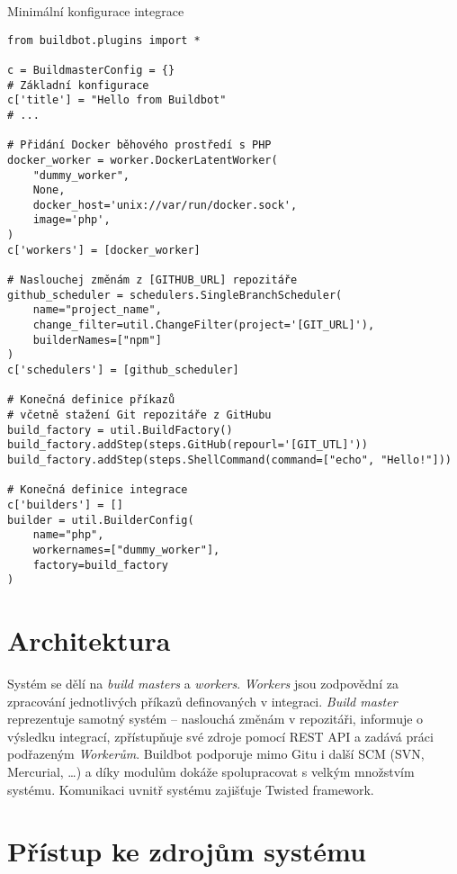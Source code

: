 \begin{listing}[ht]
\caption{\label{code:buildbot-minimal-config}Minimální konfigurace integrace}
\begin{verbatim}
from buildbot.plugins import *

c = BuildmasterConfig = {}
# Základní konfigurace
c['title'] = "Hello from Buildbot"
# ...

# Přidání Docker běhového prostředí s PHP
docker_worker = worker.DockerLatentWorker(
    "dummy_worker",
    None,
    docker_host='unix://var/run/docker.sock',
    image='php',
)
c['workers'] = [docker_worker]

# Naslouchej změnám z [GITHUB_URL] repozitáře
github_scheduler = schedulers.SingleBranchScheduler(
    name="project_name",
    change_filter=util.ChangeFilter(project='[GIT_URL]'),
    builderNames=["npm"]
)
c['schedulers'] = [github_scheduler]

# Konečná definice příkazů
# včetně stažení Git repozitáře z GitHubu
build_factory = util.BuildFactory()
build_factory.addStep(steps.GitHub(repourl='[GIT_UTL]'))
build_factory.addStep(steps.ShellCommand(command=["echo", "Hello!"]))

# Konečná definice integrace
c['builders'] = []
builder = util.BuilderConfig(
    name="php",
    workernames=["dummy_worker"],
    factory=build_factory
)

\end{verbatim}
\end{listing}

\section{Architektura}

Systém se dělí na \textit{build masters} a \textit{workers}.
\textit{Workers} jsou zodpovědní za zpracování jednotlivých příkazů definovaných v integraci.
\textit{Build master} reprezentuje samotný systém -- naslouchá změnám v repozitáři, informuje o výsledku integrací, zpřístupňuje své zdroje pomocí REST API a zadává práci podřazeným \textit{Workerům}.
Buildbot podporuje mimo Gitu i další SCM (SVN, Mercurial, \ldots) a díky modulům dokáže spolupracovat s velkým množstvím systému.
Komunikaci uvnitř systému zajišťuje Twisted framework.

\section{Přístup ke zdrojům systému}

